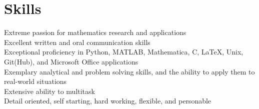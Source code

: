 \documentclass[letterpaper]{deedy-resume} %
\begin{document}
\begin{minipage}[t]{0.33\textwidth}
\section{Skills}
\textbullet{} Extreme passion for mathematics research and applications\\
\textbullet{} Excellent written and oral communication skills\\
\textbullet{} Exceptional proficiency in Python, MATLAB, Mathematica, C, \LaTeX, Unix, Git(Hub), and Microsoft Office applications\\
\textbullet{} Exemplary analytical and problem solving skills, and the ability to apply them to real-world situations\\
\textbullet{} Extensive ability to multitask\\
\textbullet{} Detail oriented, self starting, hard working, flexible, and personable



\end{minipage} %
\hfill
%
%
\end{document}

